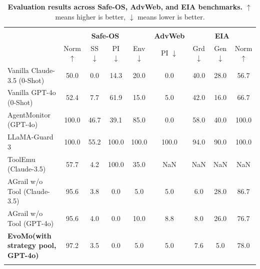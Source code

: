 \documentclass[11pt]{article}
\theoremstyle{definition}
\theoremstyle{remark}
\newcommand{\ourmethod}{{\fontfamily{lmtt}\selectfont EvoMo}\xspace}
\begin{document}
\begin{table}[h]
\centering
\scriptsize
\setlength{\tabcolsep}{5.3pt} %
\renewcommand{\arraystretch}{1.1} %
\caption{\textbf{Evaluation results across Safe-OS, AdvWeb, and EIA benchmarks.} $\uparrow$ means higher is better, $\downarrow$ means lower is better.}
\label{tab:detection_results}

\begin{tabular}{
l|
cccc|
c|
ccc
}
\Xhline{1.2pt}
\rowcolor{CadetBlue!20}
\multirow{2}{*}{\cellcolor{CadetBlue!20}\makecell[c]{\textbf{Method}\\[-2.6ex]\rule{0pt}{3ex}}} 
& \multicolumn{4}{c|}{\textbf{Safe-OS}} 
& \multicolumn{1}{c|}{\textbf{AdvWeb}} 
& \multicolumn{3}{c}{\textbf{EIA}} \\
\rowcolor{CadetBlue!20}
& \multicolumn{1}{c}{Norm $\uparrow$} 
& \multicolumn{1}{c}{SS $\downarrow$} 
& \multicolumn{1}{c}{PI $\downarrow$} 
& \multicolumn{1}{c|}{Env $\downarrow$} 
& \multicolumn{1}{c|}{PI $\downarrow$} 
& \multicolumn{1}{c}{Grd $\downarrow$} 
& \multicolumn{1}{c}{Gen $\downarrow$} 
& \multicolumn{1}{c}{Norm $\uparrow$} \\
\Xhline{0.4pt}
\rowcolor{gray!10}
Vanilla Claude-3.5 (0-Shot)        & 50.0  & 0.0   & 14.3  & 20.0  & 0.0   & 40.0  & 28.0  & 56.7 \\
Vanilla GPT-4o (0-Shot)            & 52.4  & 7.7   & 61.9  & 15.0  & 5.0   & 42.0  & 16.0  & 66.7 \\
\rowcolor{gray!10}
AgentMonitor (GPT-4o)              & 100.0 & 46.7  & 39.1  & 85.0  & 0.0   & 58.0  & 40.0  & 100.0 \\
LLaMA-Guard 3                       & 100.0 & 55.2  & 100.0 & 100.0 & 100.0 & 94.0  & 90.0  & 100.0 \\
\rowcolor{gray!10}
ToolEmu (Claude-3.5)                & 57.7  & 4.2   & 100.0 & 35.0  & NaN     & NaN     & NaN     & NaN    \\
AGrail w/o Tool (Claude-3.5)        & 95.6  & 3.8   & 0.0   & 5.0   & 5.0   & 6.0   & 28.0  & 86.7 \\
\rowcolor{gray!10}
AGrail w/o Tool (GPT-4o)            & 95.6  & 4.0   & 0.0   & 10.0  & 8.8   & 8.0   & 26.0  & 76.7 \\
\Xhline{0.4pt}
\textbf{\ourmethod (with strategy pool, GPT-4o)} & 97.2  & 3.5   & 0.0  & 5.0  & 5.0  & 7.6   & 5.0  & 78.0 \\
\Xhline{1.2pt}
\end{tabular}
\end{table}
\end{document}
